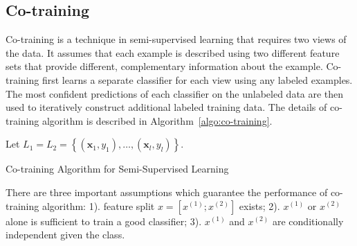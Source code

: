 \documentclass{article}
\begin{document}
\subsection{Co-training}
Co-training \cite{blum1998combining} is a technique in semi-supervised learning that requires two
views of the data. It assumes that each example is described using two
different feature sets that provide different, complementary
information about the example. Co-training first learns a separate
classifier for each view using any labeled examples. The most
confident predictions of each classifier on the unlabeled data are
then used to iteratively construct additional labeled training
data. The details of co-training algorithm is described in Algorithm~\ref{algo:co-training}.
\begin{algorithm}[h] \label{algo:co-training}
Let $L_1 = L_2 = \left \{ (\mathbf{x}_1, y_1), \ldots, (\mathbf{x}_l, y_l)
\right \}.$ \\

\caption{Co-training Algorithm for Semi-Supervised Learning}
\end{algorithm}

There are three important assumptions which guarantee the performance of
co-training algorithm: 1). feature split $x=[x^{(1)};x^{(2)}]$
exists; 2). $x^{(1)}$ or $x^{(2)}$ alone is sufficient to train a good
classifier; 3). $x^{(1)}$ and $x^{(2)}$ are conditionally independent
given the class.
\end{document}
